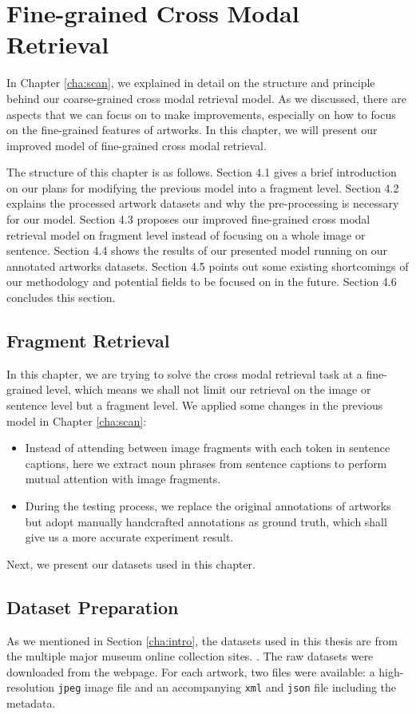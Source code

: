 \chapter{Fine-grained Cross Modal Retrieval}
\label{cha:Method}

In Chapter \ref{cha:scan}, we explained in detail on the structure and principle behind our coarse-grained cross modal retrieval model. As we discussed, there are aspects that we can focus on to make improvements, especially on how to focus on the fine-grained features of artworks. In this chapter, we will present our improved model of fine-grained cross modal retrieval.

The structure of this chapter is as follows. Section 4.1 gives a brief introduction on our plans for modifying the previous model into a fragment level. Section 4.2 explains the processed artwork datasets and why the pre-processing is necessary for our model. Section 4.3 proposes our improved fine-grained cross modal retrieval model on fragment level instead of focusing on a whole image or sentence. Section 4.4 shows the results of our presented model running on our annotated artworks datasets. Section 4.5 points out some existing shortcomings of our methodology and potential fields to be focused on in the future. Section 4.6 concludes this section.


\section{Fragment Retrieval}
In this chapter, we are trying to solve the cross modal retrieval task at a fine-grained level, which means we shall not limit our retrieval on the image or sentence level but a fragment level. We applied some changes in the previous model in Chapter \ref{cha:scan}:

\begin{itemize}
    \item Instead of attending between image fragments with each token in sentence captions, here we extract noun phrases from sentence captions to perform mutual attention with image fragments.
    \item During the testing process, we replace the original annotations of artworks but adopt manually handcrafted annotations as ground truth, which shall give us a more accurate experiment result.
\end{itemize}

Next, we present our datasets used in this chapter.

\section{Dataset Preparation}
\label{sec:dataprep}
As we mentioned in Section \ref{cha:intro}, the datasets used in this thesis are from the multiple major museum online collection sites. \cite{themet,thebritishmuseum,brooklynmuseum}. The raw datasets were downloaded from the webpage. For each artwork, two files were available: a high-resolution \verb|jpeg| image file and an accompanying \verb|xml| and \verb|json| file including the metadata.

